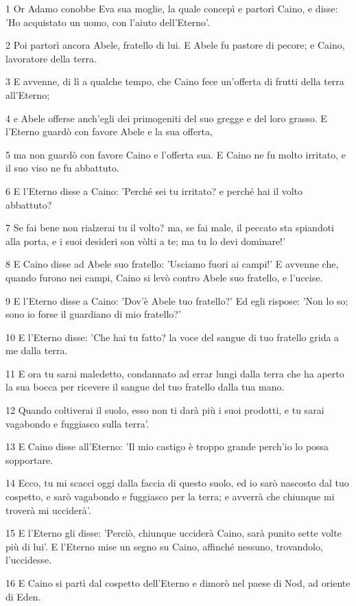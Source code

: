 \par 1 Or Adamo conobbe Eva sua moglie, la quale concepì e partorì Caino, e disse: 'Ho acquistato un uomo, con l'aiuto dell'Eterno'.
\par 2 Poi partorì ancora Abele, fratello di lui. E Abele fu pastore di pecore; e Caino, lavoratore della terra.
\par 3 E avvenne, di lì a qualche tempo, che Caino fece un'offerta di frutti della terra all'Eterno;
\par 4 e Abele offerse anch'egli dei primogeniti del suo gregge e del loro grasso. E l'Eterno guardò con favore Abele e la sua offerta,
\par 5 ma non guardò con favore Caino e l'offerta sua. E Caino ne fu molto irritato, e il suo viso ne fu abbattuto.
\par 6 E l'Eterno disse a Caino: 'Perché sei tu irritato? e perché hai il volto abbattuto?
\par 7 Se fai bene non rialzerai tu il volto? ma, se fai male, il peccato sta spiandoti alla porta, e i suoi desideri son vòlti a te; ma tu lo devi dominare!'
\par 8 E Caino disse ad Abele suo fratello: 'Usciamo fuori ai campi!' E avvenne che, quando furono nei campi, Caino si levò contro Abele suo fratello, e l'uccise.
\par 9 E l'Eterno disse a Caino: 'Dov'è Abele tuo fratello?' Ed egli rispose: 'Non lo so; sono io forse il guardiano di mio fratello?'
\par 10 E l'Eterno disse: 'Che hai tu fatto? la voce del sangue di tuo fratello grida a me dalla terra.
\par 11 E ora tu sarai maledetto, condannato ad errar lungi dalla terra che ha aperto la sua bocca per ricevere il sangue del tuo fratello dalla tua mano.
\par 12 Quando coltiverai il suolo, esso non ti darà più i suoi prodotti, e tu sarai vagabondo e fuggiasco sulla terra'.
\par 13 E Caino disse all'Eterno: 'Il mio castigo è troppo grande perch'io lo possa sopportare.
\par 14 Ecco, tu mi scacci oggi dalla faccia di questo suolo, ed io sarò nascosto dal tuo cospetto, e sarò vagabondo e fuggiasco per la terra; e avverrà che chiunque mi troverà mi ucciderà'.
\par 15 E l'Eterno gli disse: 'Perciò, chiunque ucciderà Caino, sarà punito sette volte più di lui'. E l'Eterno mise un segno su Caino, affinché nessuno, trovandolo, l'uccidesse.
\par 16 E Caino si partì dal cospetto dell'Eterno e dimorò nel paese di Nod, ad oriente di Eden.
